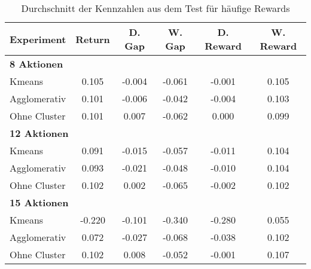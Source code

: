 \begin{table}[ht]
\centering
\begin{tabular}{lccccc}
\hline
\textbf{Experiment} & \textbf{Return} & \textbf{D. Gap} & \textbf{W. Gap} & \textbf{D. Reward} & \textbf{W. Reward} \\
\hline
\multicolumn{6}{l}{\textbf{8 Aktionen}} \\
\hspace{1em}Kmeans & 0.105 & -0.004 & -0.061 & -0.001 & 0.105 \\
\hspace{1em}Agglomerativ & 0.101 & -0.006 & -0.042 & -0.004 & 0.103 \\
\hspace{1em}Ohne Cluster & 0.101 & 0.007 & -0.062 & 0.000 & 0.099 \\
\hline
\multicolumn{6}{l}{\textbf{12 Aktionen}} \\
\hspace{1em}Kmeans & 0.091 & -0.015 & -0.057 & -0.011 & 0.104 \\
\hspace{1em}Agglomerativ & 0.093 & -0.021 & -0.048 & -0.010 & 0.104 \\
\hspace{1em}Ohne Cluster & 0.102 & 0.002 & -0.065 & -0.002 & 0.102 \\
\hline
\multicolumn{6}{l}{\textbf{15 Aktionen}} \\
\hspace{1em}Kmeans & -0.220 & -0.101 & -0.340 & -0.280 & 0.055 \\
\hspace{1em}Agglomerativ & 0.072 & -0.027 & -0.068 & -0.038 & 0.102 \\
\hspace{1em}Ohne Cluster & 0.102 & 0.008 & -0.052 & -0.001 & 0.107 \\
\hline
\end{tabular}
\caption{Durchschnitt der Kennzahlen aus dem Test für häufige Rewards}
\end{table}


